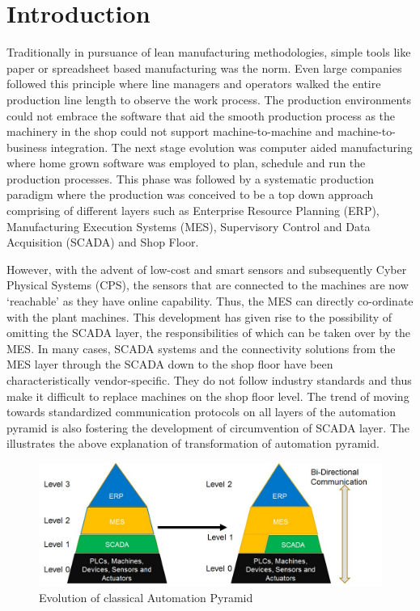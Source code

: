 \documentclass[10pt,conference,compsocconf]{IEEEtran}
\begin{document}
\IEEEpeerreviewmaketitle



\section{Introduction}
Traditionally in pursuance of lean manufacturing methodologies, simple tools like paper or spreadsheet based manufacturing was the norm. Even large companies followed this principle where line managers and operators walked the entire production line length to observe the work process. The production environments could not embrace the software that aid the smooth production process as the machinery in the shop could not support machine-to-machine and machine-to-business integration. The next stage evolution was computer aided manufacturing where home grown software was employed to plan, schedule and run the production processes.
This phase was followed by a systematic production paradigm where the production was conceived to be a top down approach comprising of different layers such as Enterprise Resource Planning (ERP), Manufacturing Execution Systems (MES), Supervisory Control and Data Acquisition (SCADA) and Shop Floor.

However, with the advent of low-cost and smart sensors and subsequently Cyber Physical Systems (CPS), the sensors that are connected to the machines are now ‘reachable’ as they have online capability. Thus, the MES can directly co-ordinate with the plant machines. This development has given rise to the possibility of omitting the SCADA layer, the responsibilities of which can be taken over by the MES. 
In many cases, SCADA systems and the connectivity solutions from the MES layer through the SCADA down to the shop floor have been characteristically vendor-specific. They do not follow industry standards and thus make it difficult to replace machines on the shop floor level. The trend of moving towards standardized communication protocols on all layers of the automation pyramid is also fostering the development of circumvention of SCADA layer. The  illustrates the above explanation of transformation of automation pyramid.
\begin{figure} [h]
\centering
\includegraphics [scale=0.25]{"Figures/Automation_Pyramid_Transformation"}
\caption{Evolution of classical Automation Pyramid}
\label{fig:Automation_Pyramid_Transformation}
\end{figure}
\end{document}
